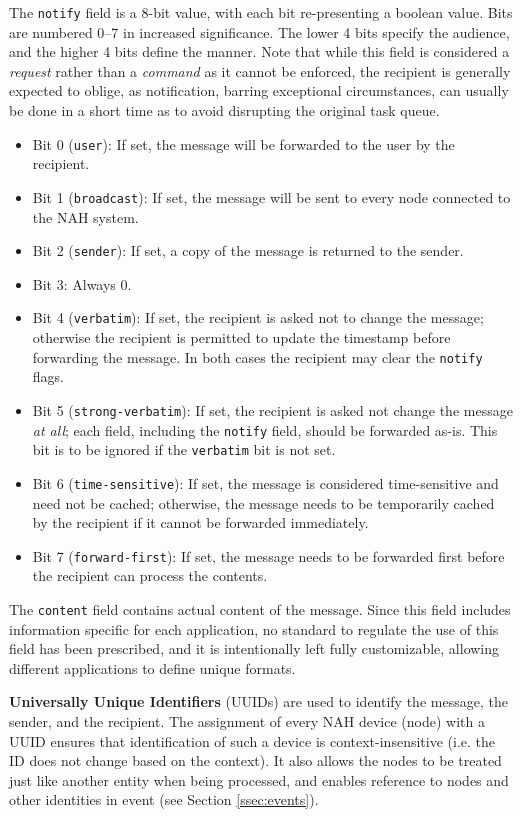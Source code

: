 \documentclass[letterpaper, twocolumn, 10pt, conference]{IEEEtran}
\newcommand{\term}[1]{\textbf{#1}}
\newcommand{\mono}[1]{\texttt{#1}}
\begin{document}
The \mono{notify} field is a 8-bit value, with each bit re-presenting a boolean value. Bits are numbered 0--7 in increased significance. The lower 4 bits specify the audience, and the higher 4 bits define the manner. Note that while this field is considered a \emph{request} rather than a \emph{command} as it cannot be enforced, the recipient is generally expected to oblige, as notification, barring exceptional circumstances, can usually be done in a short time as to avoid disrupting the original task queue.
\begin{itemize}
	\setlength\itemsep{0pt}
	\item Bit 0 (\mono{user}): If set, the message will be forwarded to the user by the recipient.	
	\item Bit 1 (\mono{broadcast}): If set, the message will be sent to every node connected to the NAH system.	
	\item Bit 2 (\mono{sender}): If set, a copy of the message is returned to the sender.	
	\item Bit 3: Always 0.	
	\item Bit 4 (\mono{verbatim}): If set, the recipient is asked not to change the message; otherwise the recipient is permitted to update the timestamp before forwarding the message. In both cases the recipient may clear the \mono{notify} flags.	
	\item Bit 5 (\mono{strong-verbatim}): If set, the recipient is asked not change the message \emph{at all}; each field, including the \mono{notify} field, should be forwarded as-is. This bit is to be ignored if the \mono{verbatim} bit is not set.	
	\item Bit 6 (\mono{time-sensitive}): If set, the message is considered time-sensitive and need not be cached; otherwise, the message needs to be temporarily cached by the recipient if it cannot be forwarded immediately.	
	\item Bit 7 (\mono{forward-first}): If set, the message needs to be forwarded first before the recipient can process the contents.
\end{itemize}

The \mono{content} field contains actual content of the message. Since this field includes information specific for each application, no standard to regulate the use of this field has been prescribed, and it is intentionally left fully customizable, allowing different applications to define unique formats.

\term{Universally Unique Identifiers} (UUIDs) are used to identify the message, the sender, and the recipient. The assignment of every NAH device (node) with a UUID ensures that identification of such a device is context-insensitive (i.e. the ID does not change based on the context). It also allows the nodes to be treated just like another entity when being processed, and enables reference to nodes and other identities in event (see Section \ref{ssec:events}).
\end{document}
